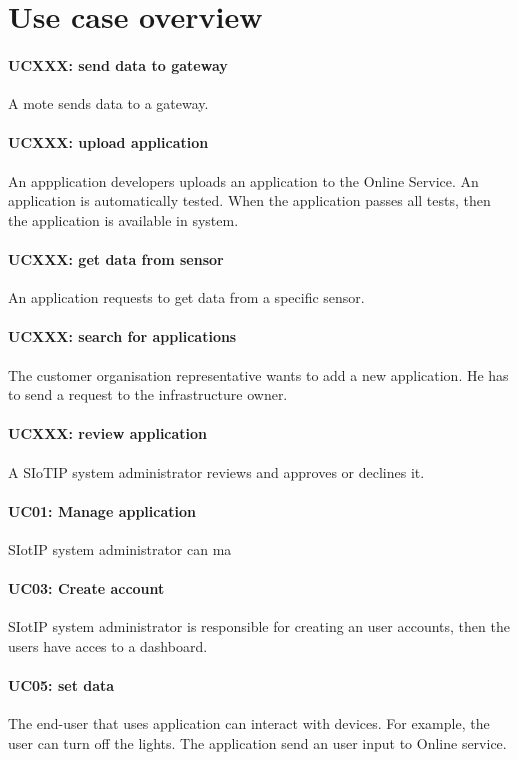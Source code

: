 \section{Use case overview}\label{sec:uc_overview}

\paragraph{UCXXX: send data to gateway}
A mote sends data to a gateway.
\paragraph{UCXXX: upload application}
An appplication developers uploads an application to the Online Service.
An application is automatically tested. When the application passes all tests, then the application
is available in system.
\paragraph{UCXXX: get data from sensor}
An application requests to get data from a specific sensor.
\paragraph{UCXXX: search for applications}
The customer organisation representative wants to add a new application. He has 
to send a request to the infrastructure owner.
\paragraph{UCXXX: review application}
A SIoTIP system administrator reviews and approves or declines it.
\paragraph{UC01: Manage application}
SIotIP system administrator can ma
\paragraph{UC03: Create account}
SIotIP system administrator is responsible for creating an user accounts, then
the users have acces to a dashboard.
\paragraph{UC05: set data}
The end-user that uses application can interact with devices. For example, the user
can turn off the lights. The application send an user input to Online service.
